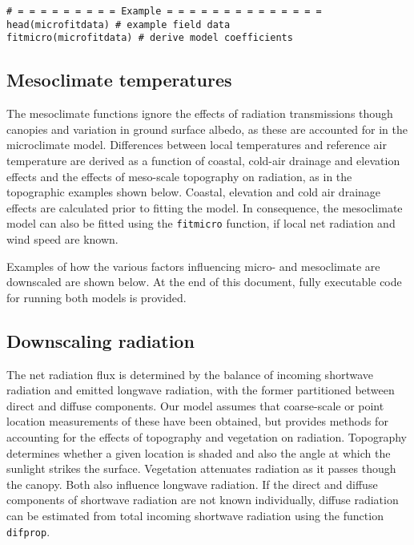 \documentclass[]{article}
\begin{document}
\begin{verbatim}
# = = = = = = = = = Example = = = = = = = = = = = = = = 
head(microfitdata) # example field data
fitmicro(microfitdata) # derive model coefficients
\end{verbatim}

\subsection{Mesoclimate temperatures}\label{mesoclimate-temperatures}

The mesoclimate functions ignore the effects of radiation transmissions
though canopies and variation in ground surface albedo, as these are
accounted for in the microclimate model. Differences between local
temperatures and reference air temperature are derived as a function of
coastal, cold-air drainage and elevation effects and the effects of
meso-scale topography on radiation, as in the topographic examples shown
below. Coastal, elevation and cold air drainage effects are calculated
prior to fitting the model. In consequence, the mesoclimate model can
also be fitted using the \texttt{fitmicro} function, if local net
radiation and wind speed are known.

Examples of how the various factors influencing micro- and mesoclimate
are downscaled are shown below. At the end of this document, fully
executable code for running both models is provided.

\subsection{Downscaling radiation}\label{downscaling-radiation}

The net radiation flux is determined by the balance of incoming
shortwave radiation and emitted longwave radiation, with the former
partitioned between direct and diffuse components. Our model assumes
that coarse-scale or point location measurements of these have been
obtained, but provides methods for accounting for the effects of
topography and vegetation on radiation. Topography determines whether a
given location is shaded and also the angle at which the sunlight
strikes the surface. Vegetation attenuates radiation as it passes though
the canopy. Both also influence longwave radiation. If the direct and
diffuse components of shortwave radiation are not known individually,
diffuse radiation can be estimated from total incoming shortwave
radiation using the function \texttt{difprop}.
\end{document}
